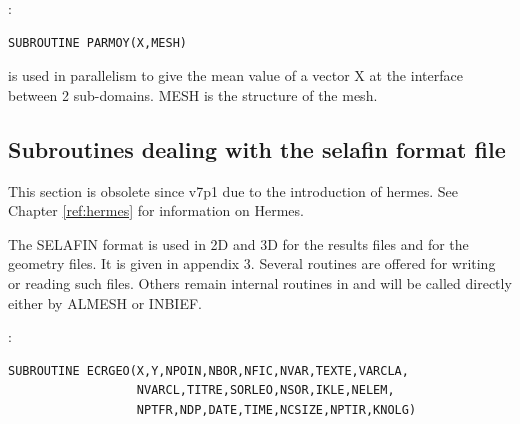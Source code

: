 :
\begin{lstlisting}[language=TelFortran]
SUBROUTINE PARMOY(X,MESH)
\end{lstlisting}

 is used in parallelism to give the mean value of a vector X at
the interface between 2 sub-domains. MESH is the  structure
of the mesh.

\subsection{Subroutines dealing with the selafin format file}
\begin{WarningBlock}
  This section is obsolete since v7p1 due to the introduction of hermes. See Chapter \ref{ref:hermes} for information on Hermes.
\end{WarningBlock}
The SELAFIN format is used in 2D and 3D for the results files and for the
geometry files. It is given in appendix 3. Several routines are offered for
writing or reading such files. Others remain internal routines in \bief and will
be called directly either by ALMESH or INBIEF.

:
\begin{lstlisting}[language=TelFortran]
SUBROUTINE ECRGEO(X,Y,NPOIN,NBOR,NFIC,NVAR,TEXTE,VARCLA,
                  NVARCL,TITRE,SORLEO,NSOR,IKLE,NELEM,
                  NPTFR,NDP,DATE,TIME,NCSIZE,NPTIR,KNOLG)
\end{lstlisting}

